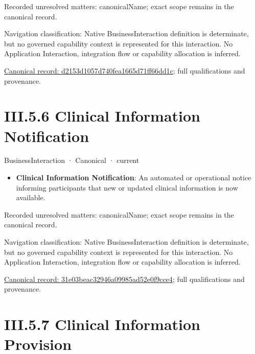 {\small Recorded unresolved matters: canonicalName; exact scope remains in the canonical record.}\par
{\small Navigation classification: Native BusinessInteraction definition is determinate, but no governed capability context is represented for this interaction. No Application Interaction, integration flow or capability allocation is inferred.}\par
{\footnotesize \href{../../../../../../../continuum/business/business-interaction/d2153d1057d740fea1665d71ff66dd1c.md}{Canonical record: d2153d1057d740fea1665d71ff66dd1c}; full qualifications and provenance.}\par
\section*{III.5.6 Clinical Information Notification}
\label{navigation:III.5.6}

\label{element:31e03beac32946a09985ad52e0f9cce4}
{\small BusinessInteraction · Canonical · current}\par

\begin{itemize}


\item \textbf{Clinical Information Notification}: An automated or operational notice informing participants that new or updated clinical information is now available.

\end{itemize}

{\small Recorded unresolved matters: canonicalName; exact scope remains in the canonical record.}\par
{\small Navigation classification: Native BusinessInteraction definition is determinate, but no governed capability context is represented for this interaction. No Application Interaction, integration flow or capability allocation is inferred.}\par
{\footnotesize \href{../../../../../../../continuum/business/business-interaction/31e03beac32946a09985ad52e0f9cce4.md}{Canonical record: 31e03beac32946a09985ad52e0f9cce4}; full qualifications and provenance.}\par
\section*{III.5.7 Clinical Information Provision}
\label{navigation:III.5.7}

